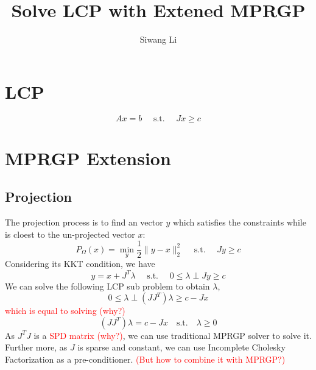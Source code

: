 \documentclass[9pt,twocolumn]{extarticle}
\author{Siwang Li}
\title{Solve LCP with Extened MPRGP}
\newcommand{\TODO}[1]{\textcolor{red}{#1}}
\begin{document}
\maketitle

\setlength{\parskip}{0.5ex}

\section{LCP}
\begin{equation}
  A x = b \quad \mbox{ s.t. } \quad J x \ge c
\end{equation}

\section{MPRGP Extension}
\subsection{Projection}
The projection process is to find an vector $y$ which satisfies the constraints while is cloest to the un-projected vector $x$:
\begin{equation}
  P_{\Omega}(x) = \min_{y}\frac{1}{2}\|y-x\|_2^2 \quad \mbox{ s.t. } \quad J y \ge c
\end{equation}
Considering its KKT condition, we have
\begin{equation}
  y = x + J^T\lambda  \quad \mbox{ s.t. } \quad 0 \le \lambda \perp J y \ge c
\end{equation}
We can solve the following LCP sub problem to obtain $\lambda$, 
\begin{equation}
   0 \le \lambda \perp (JJ^T)\lambda \ge c - Jx
\end{equation}
\TODO{which is equal to solving (why?)}
\begin{equation}
  (JJ^T)\lambda=c - Jx \quad \mbox{s.t.} \quad \lambda \ge 0
\end{equation}
As $J^TJ$ is a \TODO{SPD matrix (why?)}, we can use traditional MPRGP solver to solve it. Further more, as $J$ is sparse and constant, we can use Incomplete Cholesky Factorization as a pre-conditioner. \TODO{(But how to combine it with MPRGP?)}
\end{document}
